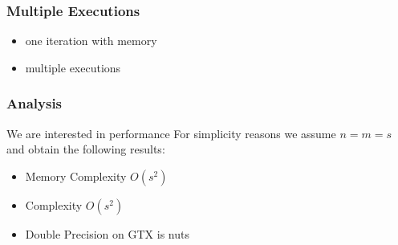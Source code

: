 \subsubsection{Multiple Executions}

\begin{itemize}
	\item one iteration with memory
	\item multiple executions
\end{itemize}

\subsubsection{Analysis}
We are interested in performance 
For simplicity reasons we assume $n=m=s$ and obtain the following results:
\begin{itemize}
	\item Memory Complexity $O(s^2)$
	\item Complexity $O(s^2)$
\end{itemize}

\begin{itemize}
	\item Double Precision on GTX is nuts
\end{itemize}

